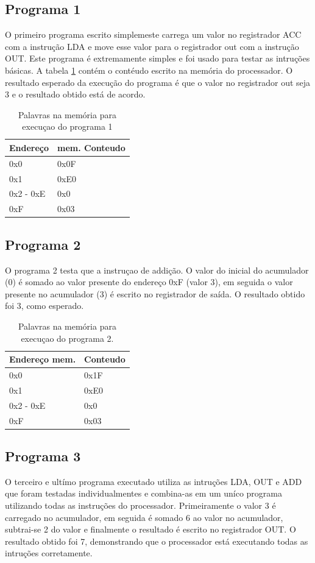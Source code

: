 \documentclass[11pt, twocolumn]{article}
\begin{document}
\subsection{Programa 1}
O primeiro programa escrito simplemeste carrega um valor no registrador ACC com a instrução LDA e move esse valor para o registrador out com a instrução OUT. Este programa é extremamente simples e foi usado para testar as intruções básicas. A tabela \ref{tab-p1} contém o contéudo escrito na memória do processador. O resultado esperado da execução do programa é que o valor no registrador out seja 3 e o resultado obtido está de acordo.

\begin{table}
  \caption{Palavras na memória para execuçao do programa 1}
\begin{tabular}{ll}
  \hline
  Endereço & mem. Conteudo \\
  \hline
  0x0 & 0x0F \\
  0x1 & 0xE0 \\
  0x2 - 0xE & 0x0 \\
  0xF & 0x03 \\
  \hline
  \end{tabular}
\label{tab-p1}
\end{table}

\subsection{Programa 2}
O programa 2 testa que a instruçao de addição. O valor do inicial do acumulador (0) é somado ao valor presente do endereço 0xF (valor 3), em seguida o valor presente no acumulador (3) é escrito no registrador de saída. O resultado obtido foi $3$, como esperado.

\begin{table}
  \caption{Palavras na memória para execuçao do programa 2.}
\begin{tabular}{ll}
  \hline
  Endereço mem. & Conteudo \\
  \hline
  0x0 & 0x1F \\
  0x1 & 0xE0 \\
  0x2 - 0xE & 0x0 \\
  0xF & 0x03 \\
  \hline
  \end{tabular}
\label{tab-p2}
\end{table}

\subsection{Programa 3}
O terceiro e ultímo programa executado utiliza as intruções LDA, OUT e ADD que foram testadas individualmentes e combina-as em um uníco programa utilizando todas as instruções do processador. Primeiramente o valor 3 é carregado no acumulador, em seguida é somado 6 ao valor no acumulador, subtrai-se 2 do valor e finalmente o resultado é escrito no registrador OUT. O resultado obtido foi 7, demonstrando que o processador está executando todas as intruções corretamente.
\end{document}
